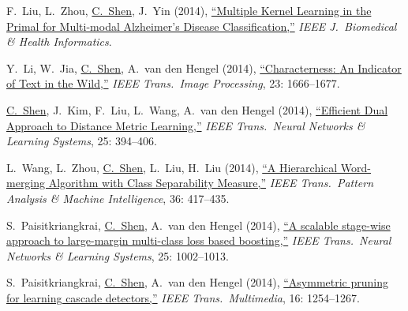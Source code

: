 \documentclass[9pt, a4paper]{article}
\newcommand{\years}[1]{\marginnote{\scriptsize #1}}
\def\highlight{\uline}
\begin{document}
\medskip

\years{2014} F.~Liu, L.~Zhou, \highlight{C.~Shen}, J.~Yin (2014),
\href{http://www.google.com/search?lr=&ie=UTF-8&oe=UTF-8&q=Multiple+Kernel+Learning+in+the+Primal+for+Multi-modal+Alzheimer%27s+Disease+Classification+Fayao+Liu%2C+Luping+Zhou%2C+Chunhua+Shen%2C+Jianping+Yin}{``Multiple Kernel Learning in the Primal for Multi-modal Alzheimer's Disease Classification,{}''}
\emph{IEEE J.\  Biomedical \& Health Informatics}.

\medskip

\years{2014} Y.~Li, W.~Jia, \highlight{C.~Shen}, A.~van den Hengel (2014),
\href{http://www.google.com/search?lr=&ie=UTF-8&oe=UTF-8&q=Characterness%3A+An+Indicator+of+Text+in+the+Wild+Yao+Li%2C+Wenjing+Jia%2C+Chunhua+Shen%2C+Anton+van+den+Hengel}{``Characterness: {A}n Indicator of Text in the Wild,{}''}
\emph{IEEE Trans.\  Image Processing}, 23: 1666--1677.

\medskip

\years{2014} \highlight{C.~Shen}, J.~Kim, F.~Liu, L.~Wang, A.~van den Hengel (2014),
\href{http://www.google.com/search?lr=&ie=UTF-8&oe=UTF-8&q=Efficient+Dual+Approach+to+Distance+Metric+Learning+Chunhua+Shen%2C+Junae+Kim%2C+Fayao+Liu%2C+Lei+Wang%2C+Anton+van+den+Hengel}{``Efficient Dual Approach to Distance Metric Learning,{}''}
\emph{IEEE Trans.\  Neural Networks \& Learning Systems}, 25: 394--406.

\medskip

\years{2014} L.~Wang, L.~Zhou, \highlight{C.~Shen}, L.~Liu, H.~Liu (2014),
\href{http://www.google.com/search?lr=&ie=UTF-8&oe=UTF-8&q=A+Hierarchical+Word-merging+Algorithm+with+Class+Separability+Measure+Lei+Wang%2C+Luping+Zhou%2C+Chunhua+Shen%2C+Lingqiao+Liu%2C+Huan+Liu}{``A Hierarchical Word-merging Algorithm with Class Separability Measure,{}''}
\emph{IEEE Trans.\  Pattern Analysis \& Machine Intelligence}, 36: 417--435.

\medskip

\years{2014} S.~Paisitkriangkrai, \highlight{C.~Shen}, A.~van den Hengel (2014),
\href{http://www.google.com/search?lr=&ie=UTF-8&oe=UTF-8&q=A+scalable+stage-wise+approach+to+large-margin+multi-class+loss+based+boosting+Sakrapee+Paisitkriangkrai%2C+Chunhua+Shen%2C+Anton+van+den+Hengel}{``A scalable stage-wise approach to large-margin multi-class loss based boosting,{}''}
\emph{IEEE Trans.\  Neural Networks \& Learning Systems}, 25: 1002--1013.

\medskip

\years{2014} S.~Paisitkriangkrai, \highlight{C.~Shen}, A.~van den Hengel (2014),
\href{http://www.google.com/search?lr=&ie=UTF-8&oe=UTF-8&q=Asymmetric+pruning+for+learning+cascade+detectors+Sakrapee+Paisitkriangkrai%2C+Chunhua+Shen%2C+Anton+van+den+Hengel}{``Asymmetric pruning for learning cascade detectors,{}''}
\emph{IEEE Trans.\  Multimedia}, 16: 1254--1267.
\end{document}
